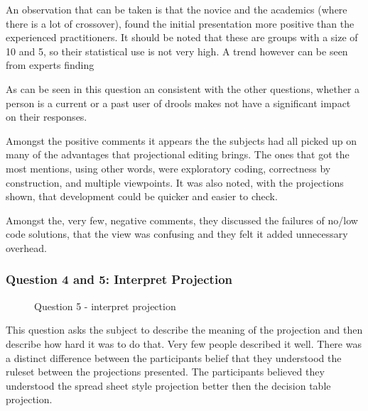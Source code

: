 An observation that can be taken is that the novice and the academics (where there is a lot of crossover), found the initial presentation more positive than the experienced practitioners.
It should be noted that these are groups with a size of 10 and 5, so their statistical use is not very high.
A trend however can be seen from experts finding

As can be seen in this question an consistent with the other questions, whether a person is a current or a past user of drools makes not have a significant impact on their responses.

Amongst the positive comments it appears the the subjects had all picked up on many of the advantages that projectional editing brings.
The ones that got the most mentions, using other words, were exploratory coding, correctness by construction, and multiple viewpoints.
It was also noted, with the projections shown, that development could be quicker and easier to check.

Amongst the, very few, negative comments, they discussed the failures of no/low code solutions, that the view was confusing and they felt it added unnecessary overhead.

\pagebreak
\subsubsection{Question 4 and 5: Interpret Projection}

\begin{figure}[H]
    \centering
    \caption{Question 5 - interpret projection}
    \label{fig:stackedbar_Q2}
\end{figure}

This question asks the subject to describe the meaning of the projection and then describe how hard it was to do that.
Very few people described it well.
There was a distinct difference between the participants belief that they understood the ruleset between the projections presented.
The participants believed they understood the spread sheet style projection better then the decision table projection.

